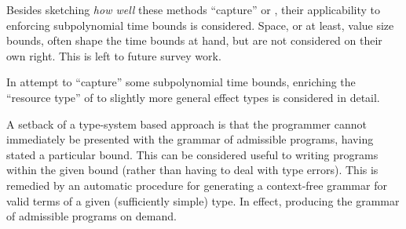Besides sketching \emph{how well} these methods ``capture'' \PTIME{} or
\FPTIME{}, their applicability to enforcing subpolynomial time bounds is
considered.  Space, or at least, value size bounds, often shape the time bounds
at hand, but are not considered on their own right. This is left to future
survey work.

In attempt to ``capture'' some subpolynomial time bounds, enriching the
``resource type'' of \cite{hofmann-2003, aehlig-schwichtenberg-2002} to
slightly more general effect types\cite{gifford-lucassen-1986} is considered in
detail.

A setback of a type-system based approach is that the programmer cannot
immediately be presented with the grammar of admissible programs, having stated
a particular bound. This can be considered useful to writing programs within
the given bound (rather than having to deal with type errors). This is remedied
by an automatic procedure for generating a context-free grammar for valid terms
of a given (sufficiently simple) type.  In effect, producing the grammar of
admissible programs on demand.
